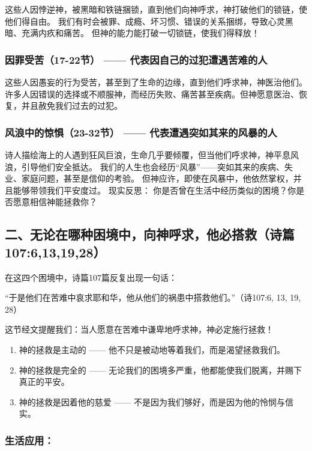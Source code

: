 \documentclass[a4paper, 12pt]{article}
\begin{document}
这些人因悖逆神，被黑暗和铁链捆锁，直到他们向神呼求，神打破他们的锁链，使他们得自由。
我们有时会被罪、成瘾、坏习惯、错误的关系捆绑，导致心灵黑暗、充满内疚和痛苦。
但神的能力能打破一切锁链，使我们得释放！
\subsubsection*{因罪受苦（17-22节） —— 代表因自己的过犯遭遇苦难的人}

这些人因愚妄的行为受苦，甚至到了生命的边缘，直到他们呼求神，神医治他们。
许多人因错误的选择或不顺服神，而经历失败、痛苦甚至疾病。但神愿意医治、恢复，并且赦免我们过去的过犯。
\subsubsection*{风浪中的惊惧（23-32节） —— 代表遭遇突如其来的风暴的人}

诗人描绘海上的人遇到狂风巨浪，生命几乎要倾覆，但当他们呼求神，神平息风浪，引导他们安全抵达。
我们的人生也会经历“风暴”——突如其来的疾病、失业、家庭问题，甚至是信仰的考验。
但神应许，即使在风暴中，他依然掌权，并且能够带领我们平安度过。
现实反思： 你是否曾在生活中经历类似的困境？你是否愿意相信神能拯救你？

\subsection*{二、无论在哪种困境中，向神呼求，他必搭救（诗篇107:6,13,19,28）}
在这四个困境中，诗篇107篇反复出现一句话：

“于是他们在苦难中哀求耶和华，他从他们的祸患中搭救他们。”（诗107:6, 13, 19, 28）

这节经文提醒我们：当人愿意在苦难中谦卑地呼求神，神必定施行拯救！
\begin{enumerate}
    \item 神的拯救是主动的 —— 他不只是被动地等着我们，而是渴望拯救我们。

    \item 神的拯救是完全的 —— 无论我们的困境多严重，他都能使我们脱离，并赐下真正的平安。

    \item 神的拯救是因着他的慈爱 —— 不是因为我们够好，而是因为他的怜悯与信实。

\end{enumerate}

\subsubsection*{生活应用：}
\end{document}
